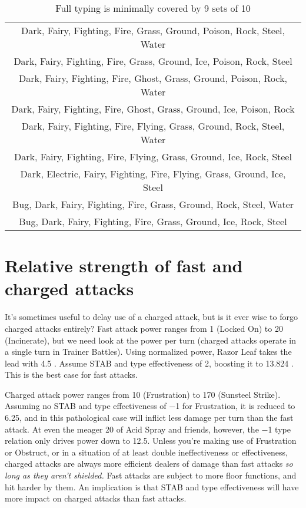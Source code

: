 \begin{table}
  \centering
  \begin{tabular}{c}
 Dark, Fairy, Fighting, Fire, Grass, Ground, Poison, Rock, Steel, Water\\
 Dark, Fairy, Fighting, Fire, Grass, Ground, Ice, Poison, Rock, Steel\\
 Dark, Fairy, Fighting, Fire, Ghost, Grass, Ground, Poison, Rock, Water\\
 Dark, Fairy, Fighting, Fire, Ghost, Grass, Ground, Ice, Poison, Rock\\
 Dark, Fairy, Fighting, Fire, Flying, Grass, Ground, Rock, Steel, Water\\
 Dark, Fairy, Fighting, Fire, Flying, Grass, Ground, Ice, Rock, Steel\\
 Dark, Electric, Fairy, Fighting, Fire, Flying, Grass, Ground, Ice, Steel\\
 Bug, Dark, Fairy, Fighting, Fire, Grass, Ground, Rock, Steel, Water\\
 Bug, Dark, Fairy, Fighting, Fire, Grass, Ground, Ice, Rock, Steel\\
  \end{tabular}
  \caption{Full typing is minimally covered by 9 sets of 10\label{table:coversetsdual}}
\end{table}

\section{Relative strength of fast and charged attacks\label{sec:fastvcharged}}
It's sometimes useful to delay use of a charged attack, but is it ever wise to forgo
  charged attacks entirely?
Fast attack power ranges from 1 (Locked On) to 20 (Incinerate), but we need look at
  the power per turn (charged attacks operate in a single turn in Trainer Battles).
Using normalized power, Razor Leaf takes the lead with 4.5 \PPT{}\@.
Assume STAB and type effectiveness of 2, boosting it to 13.824 \PPT{}\@.
This is the best case for fast attacks.

Charged attack power ranges from 10 (Frustration) to 170 (Sunsteel Strike).
Assuming no STAB and type effectiveness of −1 for Frustration, it is reduced to 6.25,
  and in this pathological case will inflict less damage per turn than the fast attack.
At even the meager 20 of Acid Spray and friends, however, the −1 type relation only
  drives power down to 12.5.
Unless you're making use of Frustration or Obstruct,
  or in a situation of at least double ineffectiveness or effectiveness,
  charged attacks are always more efficient dealers of damage than fast attacks \textit{so long
  as they aren't shielded.}
Fast attacks are subject to more floor functions, and hit harder by them.
An implication is that STAB and type effectiveness will have more impact on
 charged attacks than fast attacks.


